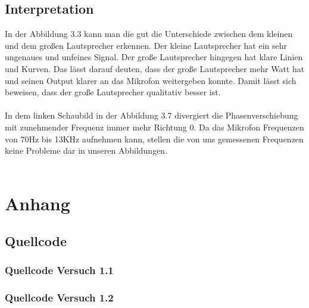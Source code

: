 \documentclass[12pt, oneside, a4paper, \docLanguage]{report}
\begin{document}
\newpage
\section{Interpretation}
\label{chap:VERSUCH_2_INTERPRETATION}
In der Abbildung 3.3 kann man die gut die Unterschiede zwischen dem kleinen und dem großen Lautsprecher erkennen.
Der kleine Lautsprecher hat ein sehr ungenaues und unfeines Signal. 
\newline
Der große Lautsprecher hingegen hat klare Linien und Kurven.
Das lässt darauf deuten, dass der große Lautsprecher mehr Watt hat und seinen Output klarer an das Mikrofon weitergeben konnte.
\newline
Damit lässt sich beweisen, dass der große Lautsprecher qualitativ besser ist.
\\~\\
In dem linken Schaubild in der Abbildung 3.7 divergiert die Phasenverschiebung mit zunehmender Frequenz immer mehr Richtung 0.
\newline
Da das Mikrofon Frequenzen von 70Hz bis 13KHz aufnehmen kann, stellen die von uns gemessenen Frequenzen keine Probleme dar in unseren Abbildungen.
\\~\\

%
%
\renewcommand\thesection{A.\arabic{section}}
\renewcommand\thesubsection{\thesection.\arabic{subsection}}

\chapter*{Anhang}
\label{chap:APPENDIX}
\addtocounter{chapter}{1}
\setcounter{section}{0}

\section{Quellcode}
\label{chap:APPENDIX_SOURCECODE}

\subsection{Quellcode Versuch 1.1}
\label{chap:APPENDIX_SOURCECODE_V1.1}

\newpage
\subsection{Quellcode Versuch 1.2}
\label{chap:APPENDIX_SOURCECODE_V1.2}

\end{document}
